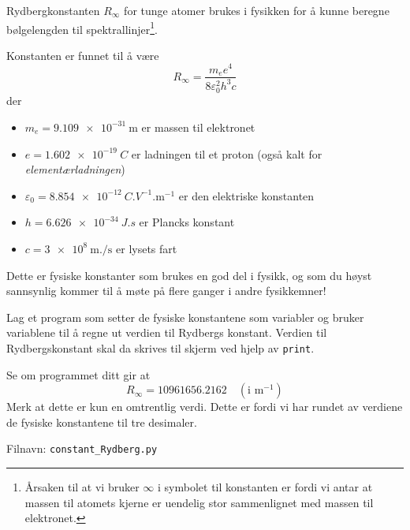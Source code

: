 \documentclass[10pt,a4paper]{article}
\begin{document}
Rydbergkonstanten $R_{\infty}$ for tunge atomer brukes i fysikken for å kunne beregne bølgelengden til spektrallinjer\footnote{Årsaken til at vi bruker $\infty$ i symbolet til konstanten er fordi vi antar at massen til atomets kjerne er uendelig stor sammenlignet med massen til elektronet.  }. 
 
Konstanten er funnet til å være
\[
R_{\infty} = \frac{m_ee^4}{8 \varepsilon_0^2h^3c }
\]
der 
\begin{itemize}
	\item $m_e = \SI{9.109e-31}{\meter}$ er massen til elektronet 
	\item $e = \SI{1.602e-19}{C}$ er ladningen til et proton (også kalt for \textit{elementærladningen})
	\item $\varepsilon_0 = \SI{8.854e-12}{C.V^{-1}.\meter^{-1}}$ er den elektriske konstanten
	\item $h = \SI{6.626e-34}{J.s}$ er Plancks konstant
	\item $c = \SI{3e8}{\meter.\per\second}$ er lysets fart
\end{itemize}
Dette er fysiske konstanter som brukes en god del i fysikk, og som du høyst sannsynlig kommer til å møte på flere ganger i andre fysikkemner!
 
Lag et program som setter de fysiske konstantene som variabler og bruker variablene til å regne ut verdien til Rydbergs konstant. Verdien til Rydbergskonstant skal da skrives til skjerm ved hjelp av \texttt{print}. 
 
Se om programmet ditt gir at
\[
R_{\infty} = 10961656.2162\quad (\text{i }\mathrm{m^{-1}})
\]
Merk at dette er kun en omtrentlig verdi. Dette er fordi vi har rundet av verdiene de fysiske konstantene til tre desimaler. 
 
Filnavn: \texttt{constant\_Rydberg.py}
\end{document}

